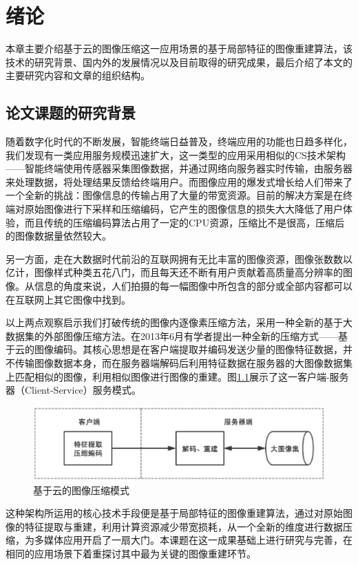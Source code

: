 
\chapter{绪论}
本章主要介绍基于云的图像压缩这一应用场景的基于局部特征的图像重建算法，该技术的研究背景、国内外的发展情况以及目前取得的研究成果，最后介绍了本文的主要研究内容和文章的组织结构。


\section{论文课题的研究背景}

随着数字化时代的不断发展，智能终端日益普及，终端应用的功能也日趋多样化，我们发现有一类应用服务规模迅速扩大，这一类型的应用采用相似的CS技术架构——智能终端使用传感器采集图像数据，并通过网络向服务器实时传输，由服务器来处理数据，将处理结果反馈给终端用户。而图像应用的爆发式增长给人们带来了一个全新的挑战：图像信息的传输占用了大量的带宽资源。目前的解决方案是在终端对原始图像进行下采样和压缩编码，它产生的图像信息的损失大大降低了用户体验，而且传统的压缩编码算法占用了一定的CPU资源，压缩比不是很高，压缩后的图像数据量依然较大。

另一方面，走在大数据时代前沿的互联网拥有无比丰富的图像资源，图像张数数以亿计，图像样式种类五花八门，而且每天还不断有用户贡献着高质量高分辨率的图像。从信息的角度来说，人们拍摄的每一幅图像中所包含的部分或全部内容都可以在互联网上其它图像中找到。

以上两点观察启示我们打破传统的图像内逐像素压缩方法，采用一种全新的基于大数据集的外部图像压缩方法。在2013年6月有学者\cite{Yue:2013gl}提出一种全新的压缩方式——基于云的图像编码。其核心思想是在客户端提取并编码发送少量的图像特征数据，并不传输图像数据本身，而在服务器端解码后利用特征数据在服务器的大图像数据集上匹配相似的图像，利用相似图像进行图像的重建。图\ref{fig:overview}展示了这一客户端-服务器（Client-Service）服务模式。
\begin{figure}
\centering\includegraphics[width=14cm]{imgs/ch1/overview}
\caption{基于云的图像压缩模式}
\label{fig:overview}
\end{figure}
这种架构所运用的核心技术手段便是基于局部特征的图像重建算法，通过对原始图像的特征提取与重建，利用计算资源减少带宽损耗，从一个全新的维度进行数据压缩，为多媒体应用开启了一扇大门。本课题在这一成果基础上进行研究与完善，在相同的应用场景下着重探讨其中最为关键的图像重建环节。

